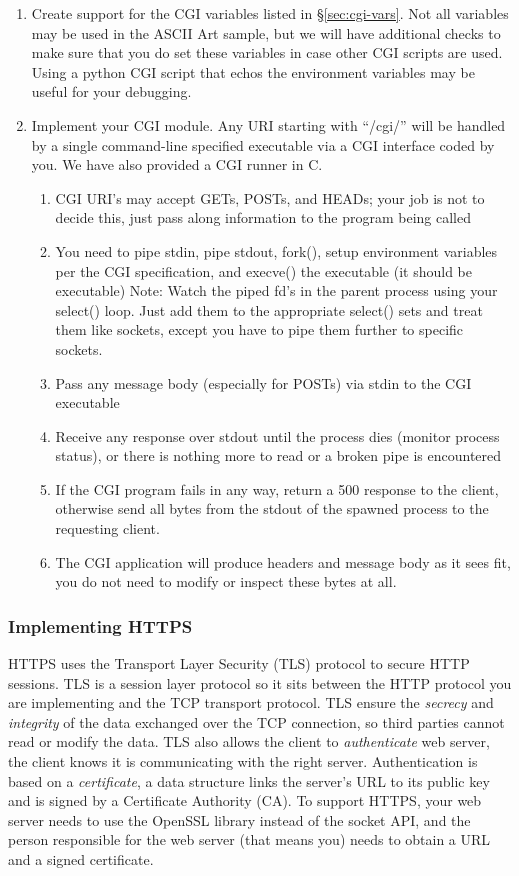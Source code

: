 \begin{enumerate}
  
  \item Create support for the CGI variables listed in \S\ref{sec:cgi-vars}. Not all variables may be used in the ASCII Art sample, but we will have additional checks to make sure that you do set these variables in case other CGI scripts are used. Using a python CGI script that echos the environment variables may be useful for your debugging.
\item Implement your CGI module. Any URI starting with ``/cgi/'' will be handled by a single command-line specified executable via a CGI interface coded by you. We have also provided a CGI runner in C. 
\begin{enumerate}
    \item CGI URI's may accept GETs, POSTs, and HEADs; your job is not to decide this, just pass along information to the program being called
    \item You need to pipe stdin, pipe stdout, fork(), setup environment variables per the CGI specification, and execve() the executable (it should be executable) Note: Watch the piped fd's in the parent process using your select() loop. Just add them to the appropriate select() sets and treat them like sockets, except you have to pipe them further to specific sockets.
    \item Pass any message body (especially for POSTs) via stdin to the CGI executable
    \item Receive any response over stdout until the process dies (monitor process status), or there is nothing more to read or a broken pipe is encountered
    \item If the CGI program fails in any way, return a 500 response to the client, otherwise send all bytes from the stdout of the spawned process to the requesting client.
    \item The CGI application will produce headers and message body as it sees fit, you do not need to modify or inspect these bytes at all.
\end{enumerate}
\end{enumerate}

\subsubsection{Implementing HTTPS}
HTTPS uses the Transport Layer Security (TLS) protocol to secure HTTP sessions.  TLS is a session layer protocol so it sits between the HTTP protocol you are implementing
and the TCP transport protocol.  TLS ensure the \emph{secrecy} and \emph{integrity} of the data exchanged over the TCP connection, so third parties cannot read or modify 
the data.  TLS also allows the client to \emph{authenticate} web server, the client knows it is communicating with the right server.  Authentication is based on a 
\emph{certificate}, a data structure links the server's URL to its public key and is signed by a Certificate Authority (CA).  To support HTTPS, your web server 
needs to use the OpenSSL library instead of the socket API, and the person responsible for the web server (that means you) needs to obtain a URL and a signed certificate.

